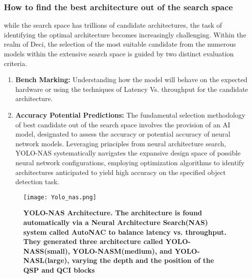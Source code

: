 \subsubsection{How to find the best architecture out of the search space}
while the search space has trillions of candidate architectures, the task of identifying the optimal architecture becomes increasingly challenging. Within the realm of Deci, the selection of the most suitable candidate from the numerous models within the extensive search space is guided by two distinct evaluation criteria. \cite{yolo-nas-webinar}
\begin{enumerate}
    \item \textbf{Bench Marking: } Understanding how the model will behave on the expected hardware or using the techniques of Latency Vs. throughput for the candidate architecture. \\
    \item \textbf{Accuracy Potential Predictions: } The fundamental selection methodology of best candidate out of the search space involves the provision of an AI model, designated to assess the accuracy or potential accuracy of neural network models. Leveraging principles from neural architecture search, YOLO-NAS systematically navigates the expansive design space of possible neural network configurations, employing optimization algorithms to identify architectures anticipated to yield high accuracy on the specified object detection task.
\end{enumerate}
 \begin{figure}[H]
     \centering
     \texttt{[image: Yolo\_nas.png]}
     \caption{\textbf{YOLO-NAS Architecture. The architecture is found automatically via a Neural Architecture Search(NAS) system called AutoNAC to balance latency vs. throughput. They generated three architecture called YOLO-NASS(small), YOLO-NASM(medium), and YOLO-NASL(large), varying the depth and the position of the QSP and QCI blocks \cite{YOLO-NAS}}}
     \label{fig:YOLO-NAS Architecture.}
\end{figure}



